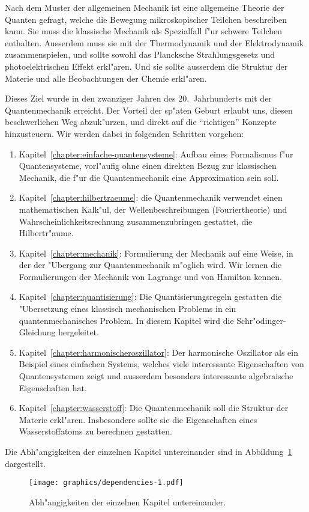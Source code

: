 Nach dem Muster der allgemeinen Mechanik ist eine allgemeine
Theorie der Quanten gefragt, welche die Bewegung mikroskopischer Teilchen
beschreiben kann. Sie muss die klassische Mechanik als Spezialfall
f"ur schwere Teilchen enthalten. Ausserdem muss sie mit der
Thermodynamik und der Elektrodynamik zusammenspielen, und sollte
sowohl das Plancksche Strahlungsgesetz und photoelektrischen
Effekt erkl"aren.
Und sie sollte ausserdem die Struktur der Materie und alle Beobachtungen
der Chemie erkl"aren.

Dieses Ziel wurde in den zwanziger Jahren des 20.~Jahrhunderts mit 
der Quantenmechanik erreicht.
Der Vorteil der sp"aten Geburt erlaubt uns, diesen beschwerlichen Weg
abzuk"urzen, und direkt auf die ``richtigen'' Konzepte hinzusteuern.
Wir werden dabei in folgenden Schritten vorgehen:
\begin{enumerate}
\item Kapitel~\ref{chapter:einfache-quantensysteme}:
Aufbau eines Formalismus f"ur Quantensysteme, vorl"aufig ohne einen
direkten Bezug zur klassischen Mechanik, die f"ur die Quantenmechanik
eine Approximation sein soll.
\item Kapitel~\ref{chapter:hilbertraeume}: die Quantenmechanik verwendet
einen mathematischen Kalk"ul, der Wellenbeschreibungen (Fouriertheorie)
und Wahrscheinlichkeitsrechnung zusammenzubringen gestattet, die Hilbertr"aume.
\item Kapitel~\ref{chapter:mechanik}: Formulierung der Mechanik auf 
eine Weise, in der der "Ubergang zur Quantenmechanik m"oglich wird.
Wir lernen die Formulierungen der Mechanik von Lagrange und von Hamilton
kennen.
\item Kapitel~\ref{chapter:quantisierung}: Die Quantisierungsregeln
gestatten die "Ubersetzung eines klassisch mechanischen Problems in 
ein quantenmechanisches Problem. In diesem Kapitel wird die
Schr"odinger-Gleichung hergeleitet.
\item Kapitel~\ref{chapter:harmonischeroszillator}: Der harmonische
Oszillator als ein Beispiel eines einfachen Systems, welches
viele interessante Eigenschaften von Quantensystemen zeigt und 
ausserdem besonders interessante algebraische Eigenschaften hat.
\item Kapitel~\ref{chapter:wasserstoff}: Die Quantenmechanik soll
die Struktur der Materie erkl"aren. Insbesondere sollte sie 
die Eigenschaften eines Wasserstoffatoms zu berechnen gestatten.
\end{enumerate}

Die Abh"angigkeiten der einzelnen Kapitel untereinander sind in
Abbildung~\ref{dependencies} dargestellt.
\begin{figure}
\centering
\texttt{[image: graphics/dependencies-1.pdf]}
\caption{Abh"angigkeiten der einzelnen Kapitel untereinander.
\label{dependencies}}
\end{figure}



